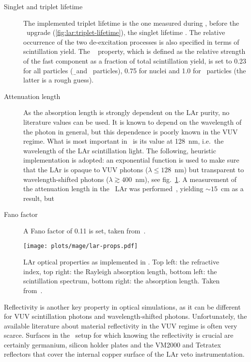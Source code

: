 \begin{description}
  \item[Singlet and triplet lifetime] \sloppy The implemented triplet lifetime is the one
    measured during \gerdatwo, before the \phasetwop\ upgrade
    (\cref{fig:lar:triplet-lifetime}), the singlet lifetime . The relative
    occurrence of the two de-excitation processes is also specified in terms of
    scintillation yield. The \geant\  property, which is defined as the
    relative strength of the fast component as a fraction of total scintillation yield, is
    set to 0.23 for all particles (\b\ and \g\ particles), 0.75 for nuclei and 1.0 for \a\
    particles (the latter is a rough guess).

  \item[Attenuation length] As the absorption length is strongly dependent on the LAr
    purity, no literature values can be used. It is known to depend on the wavelength of
    the photon in general, but this dependence is poorly known in the VUV regime. What is
    most important in \mage\ is its value at 128~nm, i.e.~the wavelength of the LAr
    scintillation light. The following, heuristic implementation is adopted: an
    exponential function is used to make sure that the LAr is opaque to VUV photons
    ($\lambda \leq 128$~nm) but transparent to wavelength-shifted photons ($\lambda
    \gtrsim 400$~nm), see fig.~\ref{fig:bkg:lar:ph2:mage:lar-props}. A measurement of the
    attenuation length in the \gerda\ LAr was performed~\cite{Barros2020}, yielding
    $\sim15$~cm as a result, but \fillme{fillme}

  \item[Fano factor] A Fano factor of 0.11 is set, taken from~\cite{Doke1976}.

\end{description}

\begin{figure}
  \centering
  \texttt{[image: plots/mage/lar-props.pdf]}
  \caption{%
    LAr optical properties as implemented in \mage. Top left: the refractive index, top
    right: the Rayleigh absorption length, bottom left: the scintillation spectrum, bottom
    right: the absorption length. Taken from~\cite{Bideau-Mehu1981, Seidel2002,
    Heindl2010}.
  }\label{fig:bkg:lar:ph2:mage:lar-props}
\end{figure}

Reflectivity is another key property in optical simulations, as it can be different for
VUV scintillation photons and wavelength-shifted photons. Unfortunately, the available
literature about material reflectivity in the VUV regime is often very scarce. Surfaces
in the \gerda\ setup for which knowing the reflectivity is crucial are certainly
germanium, silicon holder plates and the VM2000 and Tetratex\reg{} reflectors that cover
the internal copper surface of the LAr veto instrumentation.

